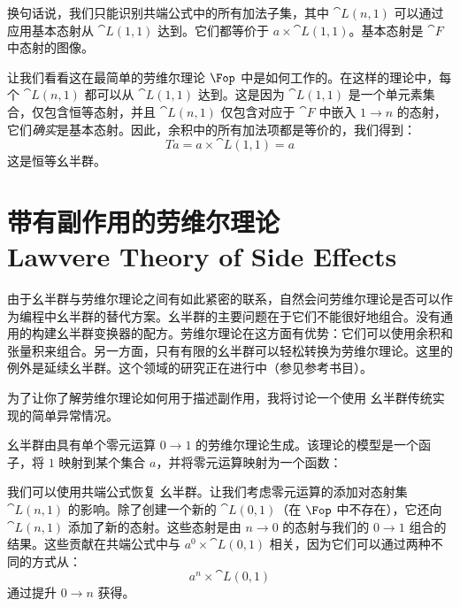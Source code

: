 换句话说，我们只能识别共端公式中的所有加法子集，其中 $\cat{L}(n, 1)$ 可以通过应用基本态射从 $\cat{L}(1, 1)$ 达到。它们都等价于 $a \times \cat{L}(1, 1)$。基本态射是 $\cat{F}$ 中态射的图像。

让我们看看这在最简单的劳维尔理论 $\Fop$ 中是如何工作的。在这样的理论中，每个 $\cat{L}(n, 1)$ 都可以从 $\cat{L}(1, 1)$ 达到。这是因为 $\cat{L}(1, 1)$ 是一个单元素集合，仅包含恒等态射，并且 $\cat{L}(n, 1)$ 仅包含对应于 $\cat{F}$ 中嵌入 $1 \to n$ 的态射，它们\emph{确实}是基本态射。因此，余积中的所有加法项都是等价的，我们得到：
\[T a = a \times \cat{L}(1, 1) = a\]
这是恒等幺半群。

\section{带有副作用的劳维尔理论\\ \textmd{Lawvere Theory of Side Effects}}

由于幺半群与劳维尔理论之间有如此紧密的联系，自然会问劳维尔理论是否可以作为编程中幺半群的替代方案。幺半群的主要问题在于它们不能很好地组合。没有通用的构建幺半群变换器的配方。劳维尔理论在这方面有优势：它们可以使用余积和张量积来组合。另一方面，只有有限的幺半群可以轻松转换为劳维尔理论。这里的例外是延续幺半群。这个领域的研究正在进行中（参见参考书目）。

为了让你了解劳维尔理论如何用于描述副作用，我将讨论一个使用  幺半群传统实现的简单异常情况。

 幺半群由具有单个零元运算 $0 \to 1$ 的劳维尔理论生成。该理论的模型是一个函子，将 $1$ 映射到某个集合 $a$，并将零元运算映射为一个函数：

我们可以使用共端公式恢复  幺半群。让我们考虑零元运算的添加对态射集 $\cat{L}(n, 1)$ 的影响。除了创建一个新的 $\cat{L}(0, 1)$（在 $\Fop$ 中不存在），它还向 $\cat{L}(n, 1)$ 添加了新的态射。这些态射是由 $n \to 0$ 的态射与我们的 $0 \to 1$ 组合的结果。这些贡献在共端公式中与 $a^0 \times \cat{L}(0, 1)$ 相关，因为它们可以通过两种不同的方式从：
\[a^n \times \cat{L}(0, 1)\]
通过提升 $0 \to n$ 获得。

\begin{figure}[H]
  \centering
\end{figure}

